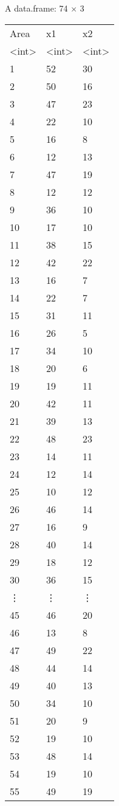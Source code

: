 \documentclass[11pt]{article}
\begin{document}
    A data.frame: 74 × 3
\begin{tabular}{lll}
 Area & x1 & x2\\
 <int> & <int> & <int>\\
\hline
	  1 & 52 & 30\\
	  2 & 50 & 16\\
	  3 & 47 & 23\\
	  4 & 22 & 10\\
	  5 & 16 &  8\\
	  6 & 12 & 13\\
	  7 & 47 & 19\\
	  8 & 12 & 12\\
	  9 & 36 & 10\\
	 10 & 17 & 10\\
	 11 & 38 & 15\\
	 12 & 42 & 22\\
	 13 & 16 &  7\\
	 14 & 22 &  7\\
	 15 & 31 & 11\\
	 16 & 26 &  5\\
	 17 & 34 & 10\\
	 18 & 20 &  6\\
	 19 & 19 & 11\\
	 20 & 42 & 11\\
	 21 & 39 & 13\\
	 22 & 48 & 23\\
	 23 & 14 & 11\\
	 24 & 12 & 14\\
	 25 & 10 & 12\\
	 26 & 46 & 14\\
	 27 & 16 &  9\\
	 28 & 40 & 14\\
	 29 & 18 & 12\\
	 30 & 36 & 15\\
	 ⋮ & ⋮ & ⋮\\
	 45 & 46 & 20\\
	 46 & 13 &  8\\
	 47 & 49 & 22\\
	 48 & 44 & 14\\
	 49 & 40 & 13\\
	 50 & 34 & 10\\
	 51 & 20 &  9\\
	 52 & 19 & 10\\
	 53 & 48 & 14\\
	 54 & 19 & 10\\
	 55 & 49 & 19\\

\end{tabular}
\end{document}
